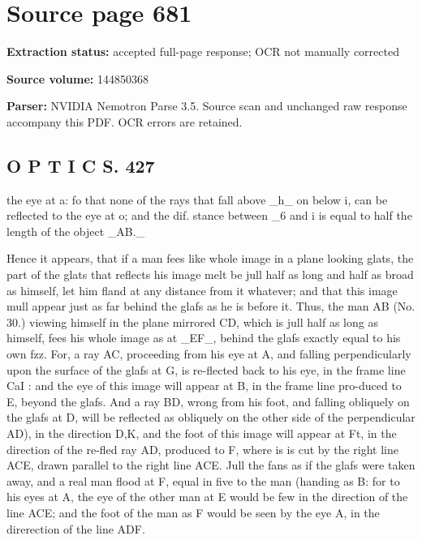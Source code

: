\clearpage
\section{Source page 681}
\textbf{Extraction status:} accepted full-page response; OCR not manually corrected\par
\textbf{Source volume:} 144850368\par
\textbf{Parser:} NVIDIA Nemotron Parse 3.5. Source scan and unchanged raw response accompany this PDF. OCR errors are retained.\par\medskip
\subsection*{O P T I C S. 427}
the eye at a: fo that none of the rays that fall above \_h\_ on below i, can be reflected to the eye at o; and the dif. stance between \_6 and i is equal to half the length of the object \_AB.\_\par\medskip
Hence it appears, that if a man fees like whole image in a plane looking glats, the part of the glats that reflects his image melt be jull half as long and half as broad as himself, let him fland at any distance from it whatever; and that this image mull appear just as far behind the glafs as he is before it. Thus, the man AB (No. 30.) viewing himself in the plane mirrored CD, which is jull half as long as himself, fees his whole image as at \_EF\_, behind the glafs exactly equal to his own fzz. For, a ray AC, proceeding from his eye at A, and falling perpendicularly upon the surface of the glafs at G, is re-flected back to his eye, in the frame line CaI : and the eye of this image will appear at B, in the frame line pro-duced to E, beyond the glafs. And a ray BD, wrong from his foot, and falling obliquely on the glafs at D, will be reflected as obliquely on the other side of the perpendicular AD), in the direction D,K, and the foot of this image will appear at Ft, in the direction of the re-fled ray AD, produced to F, where is is cut by the right line ACE, drawn parallel to the right line ACE. Jull the fans as if the glafs were taken away, and a real man flood at F, equal in five to the man (handing as B: for to his eyes at A, the eye of the other man at E would be few in the direction of the line ACE; and the foot of the man as F would be seen by the eye A, in the direrection of the line ADF.\par\medskip
